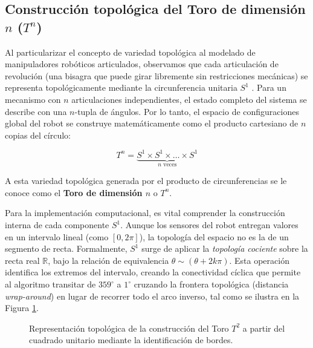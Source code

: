 \subsection{Construcción topológica del Toro de dimensión $n$ ($T^n$)}

Al particularizar el concepto de variedad topológica al modelado de manipuladores robóticos articulados, observamos que cada articulación de revolución 
(una bisagra que puede girar libremente sin restricciones mecánicas) se representa 
topológicamente mediante la circunferencia unitaria $S^1$ \parencite{farber2008}. Para un mecanismo con $n$ 
articulaciones independientes, el estado completo del sistema se describe con una $n$-tupla de 
ángulos. Por lo tanto, el espacio de configuraciones global del robot se construye 
matemáticamente como el producto cartesiano de $n$ copias del círculo:

$$ T^n = \underbrace{S^1 \times S^1 \times \dots \times S^1}_{n \text{ veces}} $$

A esta variedad topológica generada por el producto de circunferencias se le conoce como 
el \textbf{Toro de dimensión $n$} o $T^n$.

Para la implementación computacional, es vital comprender la construcción 
interna de cada componente $S^1$. Aunque los sensores del robot entregan valores en un 
intervalo lineal (como $[0, 2\pi]$), la topología del espacio no es la de un 
segmento de recta. Formalmente, $S^1$ surge de aplicar la \textit{topología cociente} \parencite{antonyan2016topologia} sobre 
la recta real $\mathbb{R}$, bajo la relación de equivalencia $\theta \sim (\theta + 2k\pi)$. 
Esta operación identifica los extremos del intervalo, creando la conectividad 
cíclica que permite al algoritmo transitar de $359^\circ$ a $1^\circ$ cruzando la frontera 
topológica (distancia \textit{wrap-around}) en lugar de recorrer todo el arco inverso, 
tal como se ilustra en la Figura \ref{fig:construccion_toro}.

\begin{figure}[htbp]
    \centering
    

    \caption{Representación topológica de la construcción del Toro $T^2$ a partir del cuadrado unitario mediante la identificación de bordes.}
    \label{fig:construccion_toro}
\end{figure}

